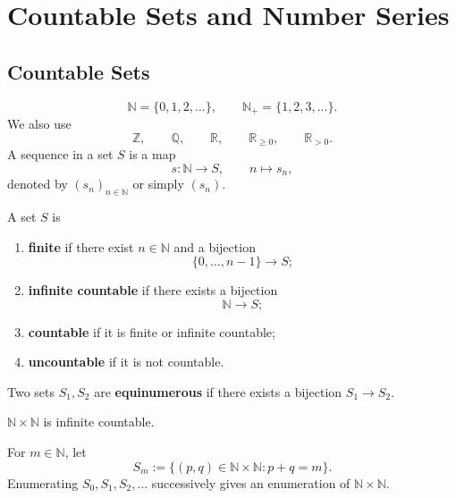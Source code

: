 \chapter{Countable Sets and Number Series}

\section{Countable Sets}

\begin{notationenv}
\[
    \mathbb N=\{0,1,2,\ldots\},
    \qquad
    \mathbb N_+=\{1,2,3,\ldots\}.
\]
We also use
\[
    \mathbb Z,\qquad \mathbb Q,\qquad \mathbb R,
    \qquad
    \mathbb R_{\ge0},\qquad \mathbb R_{>0}.
\]
A sequence in a set $S$ is a map
\[
    s:\mathbb N\to S,\qquad n\mapsto s_n,
\]
denoted by $(s_n)_{n\in\mathbb N}$ or simply $(s_n)$.
\end{notationenv}

\begin{definitionenv}
A set $S$ is
\begin{enumerate}[label=(\arabic*)]
    \item \textbf{finite} if there exist $n\in\mathbb N$ and a bijection
    \[
        \{0,\ldots,n-1\}\longrightarrow S;
    \]
    \item \textbf{infinite countable} if there exists a bijection
    \[
        \mathbb N\longrightarrow S;
    \]
    \item \textbf{countable} if it is finite or infinite countable;
    \item \textbf{uncountable} if it is not countable.
\end{enumerate}
\end{definitionenv}

\begin{definitionenv}
Two sets $S_1,S_2$ are \textbf{equinumerous} if there exists a bijection
$S_1\to S_2$.
\end{definitionenv}

\begin{theoremenv}
$\mathbb N\times\mathbb N$ is infinite countable.
\end{theoremenv}

\begin{proofenv}
For $m\in\mathbb N$, let
\[
    S_m:=\{(p,q)\in\mathbb N\times\mathbb N:p+q=m\}.
\]
Enumerating $S_0,S_1,S_2,\ldots$ successively gives an enumeration of
$\mathbb N\times\mathbb N$.
\end{proofenv}

